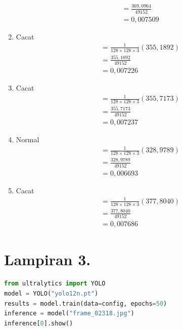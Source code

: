 \begin{enumerate}
\begin{align*}
      &= \frac{369,0964}{49152} \\
      &= 0,007509
    \end{align*}
  \item Cacat
    \begin{align*}
      &= \frac{1}{128 \times 128 \times 3} (355,1892) \\
      &= \frac{355,1892}{49152} \\
      &= 0,007226
    \end{align*}
  \item Cacat
    \begin{align*}
      &= \frac{1}{128 \times 128 \times 3} (355,7173) \\
      &= \frac{355,7173}{49152} \\
      &= 0,007237
    \end{align*}
  \item Normal
    \begin{align*}
      &= \frac{1}{128 \times 128 \times 3} (328,9789) \\
      &= \frac{328,9789}{49152} \\
      &= 0,006693
    \end{align*}
  \item Cacat
    \begin{align*}
      &= \frac{1}{128 \times 128 \times 3} (377,8040) \\
      &= \frac{377,8040}{49152} \\
      &= 0,007686
    \end{align*}
\end{enumerate}

\vspace*{1em}

\section*{Lampiran 3. }
\label{Lampiran 3}
\begin{lstlisting}[language=Python]
from ultralytics import YOLO
model = YOLO("yolo12n.pt")
results = model.train(data=config, epochs=50)
inference = model("frame_02318.jpg")
inference[0].show()
\end{lstlisting}

\newpage
